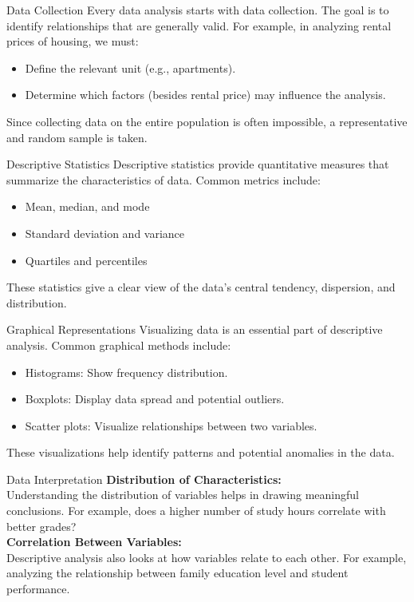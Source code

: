 \documentclass{beamer}
\begin{document}
	\begin{frame}{Data Collection}
		Every data analysis starts with data collection. The goal is to identify relationships that are generally valid. For example, in analyzing rental prices of housing, we must:
		\begin{itemize}
			\item Define the relevant unit (e.g., apartments).
			\item Determine which factors (besides rental price) may influence the analysis.
		\end{itemize}
		Since collecting data on the entire population is often impossible, a representative and random sample is taken.
	\end{frame}
	
	\begin{frame}{Descriptive Statistics}
		Descriptive statistics provide quantitative measures that summarize the characteristics of data. Common metrics include:
		\begin{itemize}
			\item Mean, median, and mode
			\item Standard deviation and variance
			\item Quartiles and percentiles
		\end{itemize}
		These statistics give a clear view of the data's central tendency, dispersion, and distribution.
	\end{frame}
	
	\begin{frame}{Graphical Representations}
		Visualizing data is an essential part of descriptive analysis. Common graphical methods include:
		\begin{itemize}
			\item Histograms: Show frequency distribution.
			\item Boxplots: Display data spread and potential outliers.
			\item Scatter plots: Visualize relationships between two variables.
		\end{itemize}
		These visualizations help identify patterns and potential anomalies in the data.
	\end{frame}
	
	\begin{frame}{Data Interpretation}
		\textbf{Distribution of Characteristics:} \\
		Understanding the distribution of variables helps in drawing meaningful conclusions. For example, does a higher number of study hours correlate with better grades? \\
		\vspace{0.5cm}
		\textbf{Correlation Between Variables:} \\
		Descriptive analysis also looks at how variables relate to each other. For example, analyzing the relationship between family education level and student performance.
	\end{frame}
	
\end{document}
